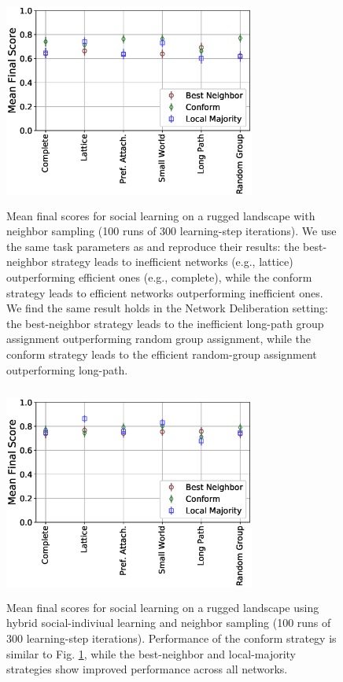 \begin{figure}
    \centering
    \includegraphics[width=3.25in,height=2.75in]{fig-performance-bg16.eps}
    \caption{Mean final scores for social learning on a rugged landscape with neighbor sampling (100 runs of 300 learning-step iterations). We use the same task parameters as \cite{barkoczi_social_2016} and reproduce their results: the best-neighbor strategy leads to inefficient networks (e.g., lattice) outperforming efficient ones (e.g., complete), while the conform strategy leads to efficient networks outperforming inefficient ones. We find the same result holds in the Network Deliberation setting: the best-neighbor strategy leads to the inefficient long-path group assignment outperforming random group assignment, while the conform strategy leads to the efficient random-group assignment outperforming long-path.}
    \label{fig:result-bg16}
\end{figure}

\begin{figure}
    \centering
    \includegraphics[width=3.25in,height=2.75in]{fig-performance-hybrid.eps}
    \caption{Mean final scores for social learning on a rugged landscape using hybrid social-indiviual learning and neighbor sampling (100 runs of 300 learning-step iterations). Performance of the conform strategy is similar to Fig. \ref{fig:result-bg16}, while the best-neighbor and local-majority strategies show improved performance across all networks.}
    \label{fig:result-hybrid}
\end{figure}

